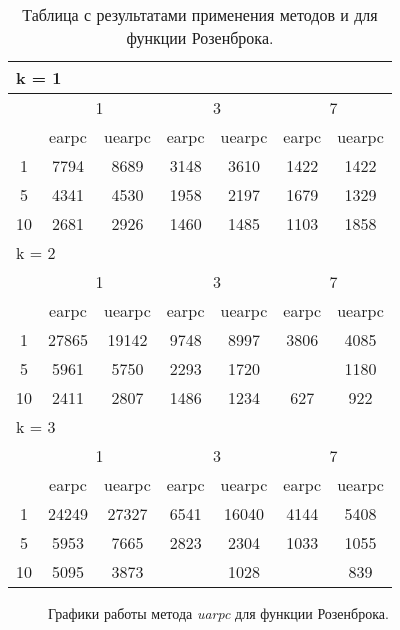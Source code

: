 \begin{table}
  \centering
  \begin{tabular}{|*7{c|}}
    \hline
    \multicolumn{7}{|l|}{k = 1} \\
    \hline
    \multirow{2}{*}{\diagbox{$\mu$}{$\lambda$}} & \multicolumn{2}{c|}{1} & \multicolumn{2}{c|}{3} & \multicolumn{2}{c|}{7} \\
    \cline{2-7}
    & earpc & uearpc & earpc & uearpc & earpc & uearpc \\
    \hline
    1 & 7794 & 8689 & 3148 & 3610 & 1422 & 1422 \\
    \hline
    5 & 4341 & 4530 & 1958 & 2197 & 1679 & 1329 \\
    \hline
    10 & 2681 & 2926 & 1460 & 1485 & 1103 & 1858 \\
    \hline
    \multicolumn{7}{|l|}{k = 2} \\
    \hline
    \multirow{2}{*}{\diagbox{$\mu$}{$\lambda$}} & \multicolumn{2}{c|}{1} & \multicolumn{2}{c|}{3} & \multicolumn{2}{c|}{7} \\
    \cline{2-7}
    & earpc & uearpc & earpc & uearpc & earpc & uearpc \\
    \hline
    1 & 27865 & 19142 & 9748 & 8997 & 3806 & 4085 \\
    \hline
    5 & 5961 & 5750 & 2293 & 1720& \cellcolor{olive}{933} & 1180 \\
    \hline
    10 & 2411 & 2807 & 1486 & 1234 & 627 & 922 \\
    \hline
    \multicolumn{7}{|l|}{k = 3} \\
    \hline
    \multirow{2}{*}{\diagbox{$\mu$}{$\lambda$}} & \multicolumn{2}{c|}{1} & \multicolumn{2}{c|}{3} & \multicolumn{2}{c|}{7} \\
    \cline{2-7}
    & earpc & uearpc & earpc & uearpc & earpc & uearpc \\
    \hline
    1 & 24249 & 27327 & 6541 & 16040 & 4144 & 5408 \\
    \hline
    5 & 5953 & 7665 & 2823& 2304 & 1033 & 1055 \\
    \hline
    10 & 5095 & 3873& \cellcolor{olive}{1013} & 1028& \cellcolor{olive}{779} & 839 \\
    \hline
  \end{tabular}
  \captionsetup{justification=centering}
  \caption{Таблица с результатами применения методов  и  для функции Розенброка.}
\end{table}

\begin{figure}
  \centering
  \caption{ Графики работы метода \textit{uarpc} для функции Розенброка.}
  \label{uarpc_rosenbrock_plot}
\end{figure}

